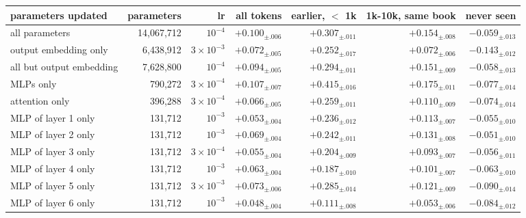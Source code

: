 \begin{tabular}{lrrrrrr}
\toprule
parameters updated & parameters & lr & all tokens & earlier, $<$ 1k & 1k-10k, same book & never seen \\
\midrule
all parameters & 14,067,712 & $10^{-4}$ & $+0.100_{\pm .006}$ & $+0.307_{\pm .011}$ & $+0.154_{\pm .008}$ & $-0.059_{\pm .013}$ \\
output embedding only & 6,438,912 & $3\!\times\!10^{-3}$ & $+0.072_{\pm .005}$ & $+0.252_{\pm .017}$ & $+0.072_{\pm .006}$ & $-0.143_{\pm .012}$ \\
all but output embedding & 7,628,800 & $10^{-4}$ & $+0.094_{\pm .005}$ & $+0.294_{\pm .011}$ & $+0.151_{\pm .009}$ & $-0.058_{\pm .013}$ \\
MLPs only & 790,272 & $3\!\times\!10^{-4}$ & $+0.107_{\pm .007}$ & $+0.415_{\pm .016}$ & $+0.175_{\pm .011}$ & $-0.077_{\pm .014}$ \\
attention only & 396,288 & $3\!\times\!10^{-4}$ & $+0.066_{\pm .005}$ & $+0.259_{\pm .011}$ & $+0.110_{\pm .009}$ & $-0.074_{\pm .014}$ \\
MLP of layer 1 only & 131,712 & $10^{-3}$ & $+0.053_{\pm .004}$ & $+0.236_{\pm .012}$ & $+0.113_{\pm .007}$ & $-0.055_{\pm .010}$ \\
MLP of layer 2 only & 131,712 & $10^{-3}$ & $+0.069_{\pm .004}$ & $+0.242_{\pm .011}$ & $+0.131_{\pm .008}$ & $-0.051_{\pm .010}$ \\
MLP of layer 3 only & 131,712 & $3\!\times\!10^{-4}$ & $+0.055_{\pm .004}$ & $+0.204_{\pm .009}$ & $+0.093_{\pm .007}$ & $-0.056_{\pm .011}$ \\
MLP of layer 4 only & 131,712 & $10^{-3}$ & $+0.063_{\pm .004}$ & $+0.187_{\pm .010}$ & $+0.101_{\pm .007}$ & $-0.063_{\pm .010}$ \\
MLP of layer 5 only & 131,712 & $3\!\times\!10^{-3}$ & $+0.073_{\pm .006}$ & $+0.285_{\pm .014}$ & $+0.121_{\pm .009}$ & $-0.090_{\pm .014}$ \\
MLP of layer 6 only & 131,712 & $10^{-3}$ & $+0.048_{\pm .004}$ & $+0.111_{\pm .008}$ & $+0.053_{\pm .006}$ & $-0.084_{\pm .012}$ \\
\bottomrule
\end{tabular}
